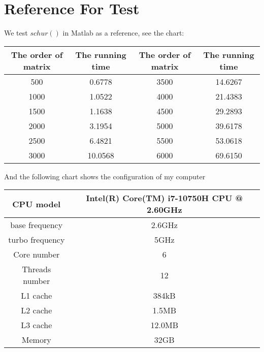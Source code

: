     \renewcommand{\thechapter}{\Alph{chapter}.}
    \chapter{Reference For Test}
    We test \(schur( )\) in Matlab as a reference, see the chart:
    \begin{table}[H]
\large
\begin{tabular}{|c|c|c|c|}
\hline
The order of matrix & The running time & The order of matrix & The running time \\ \hline
500                 & 0.6778           & 3500                & 14.6267          \\ \hline
1000                & 1.0522           & 4000                & 21.4383          \\ \hline
1500                & 1.1638           & 4500                & 29.2893          \\ \hline
2000                & 3.1954           & 5000                & 39.6178          \\ \hline
2500                & 6.4821           & 5500                & 53.0618          \\ \hline
3000                & 10.0568          & 6000                & 69.6150          \\ \hline
\end{tabular}
\end{table}
And the following chart shows the configuration of my computer
\begin{table}[H]
\large
\begin{tabular}{|c|c|}
\hline
CPU model       & Intel(R) Core(TM) i7-10750H CPU @ 2.60GHz \\ \hline
base frequency  & 2.6GHz                                    \\ \hline
turbo frequency & 5GHz                                      \\ \hline
Core number     & 6                                         \\ \hline
Threads number  & 12                                        \\ \hline
L1 cache        & 384kB                                     \\ \hline
L2 cache        & 1.5MB                                     \\ \hline
L3 cache        & 12.0MB                                    \\ \hline
Memory          & 32GB                                      \\ \hline
\end{tabular}
\end{table}
